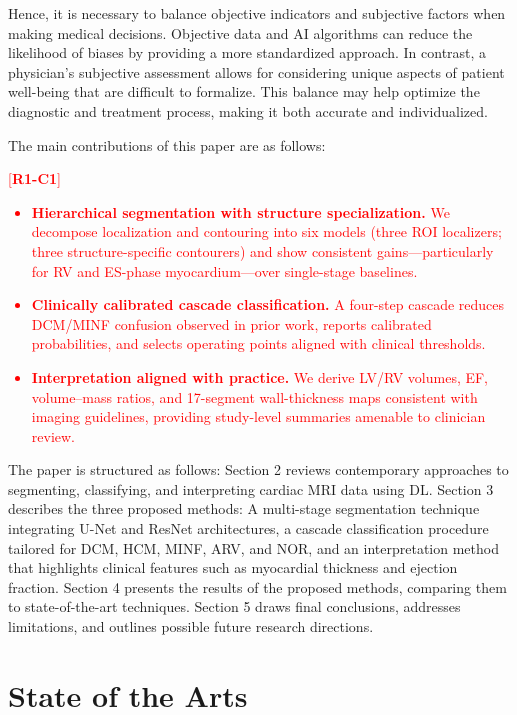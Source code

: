 \documentclass[fleqn,10pt]{wlscirep}
\newcommand{\revtag}[2]{[\textbf{R#1-C#2}]}
\newcommand{\Rone}[1]{\textcolor{red}{#1}}
\begin{document}
Hence, it is necessary to balance objective indicators and subjective factors when making medical decisions. Objective data and AI algorithms can reduce the likelihood of biases by providing a more standardized approach. In contrast, a physician’s subjective assessment allows for considering unique aspects of patient well-being that are difficult to formalize. This balance may help optimize the diagnostic and treatment process, making it both accurate and individualized.

The main contributions of this paper are as follows:
\Rone{\revtag{1}{1} %
\begin{itemize}
    \item \textbf{Hierarchical segmentation with structure specialization.} We decompose localization and contouring into six models (three ROI localizers; three structure-specific contourers) and show consistent gains—particularly for RV and ES-phase myocardium—over single-stage baselines\cite{Ronneberger:2015,Hu:2023,daSilva:2024}.
    \item \textbf{Clinically calibrated cascade classification.} A four-step cascade reduces DCM/MINF confusion observed in prior work\cite{Isensee:2018,Khened:2019,Zheng:2019}, reports calibrated probabilities, and selects operating points aligned with clinical thresholds.
    \item \textbf{Interpretation aligned with practice.} We derive LV/RV volumes, EF, volume–mass ratios, and 17-segment wall-thickness maps consistent with imaging guidelines\cite{Szabo:2022,Watanabe:2022}, providing study-level summaries amenable to clinician review.
\end{itemize}
}

The paper is structured as follows: Section 2 reviews contemporary approaches to segmenting, classifying, and interpreting cardiac MRI data using DL. Section 3 describes the three proposed methods: A multi-stage segmentation technique integrating U-Net and ResNet architectures, a cascade classification procedure tailored for DCM, HCM, MINF, ARV, and NOR, and an interpretation method that highlights clinical features such as myocardial thickness and ejection fraction. Section 4 presents the results of the proposed methods, comparing them to state-of-the-art techniques. Section 5 draws final conclusions, addresses limitations, and outlines possible future research directions.

\section*{State of the Arts}
\end{document}

